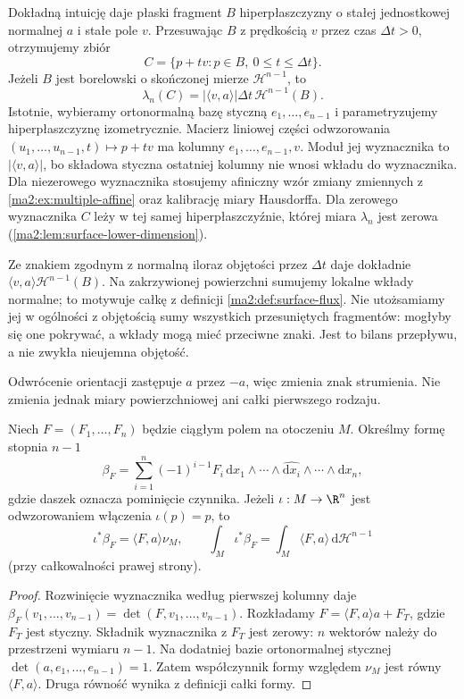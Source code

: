 Dokładną intuicję daje płaski fragment $B$
hiperpłaszczyzny o stałej jednostkowej normalnej $a$
i stałe pole $v$. Przesuwając $B$ z prędkością $v$
przez czas $\Delta t>0$, otrzymujemy zbiór
\[
 C=\{p+tv:p\in B,\ 0\le t\le\Delta t\}.
\]
Jeżeli $B$ jest borelowski o skończonej mierze
$\mathcal H^{n-1}$, to
\[
 \lambda_n(C)=
 |\langle v,a\rangle|\Delta t\,\mathcal H^{n-1}(B).
\]
Istotnie, wybieramy ortonormalną bazę styczną
$e_1,\ldots,e_{n-1}$ i parametryzujemy
hiperpłaszczyznę izometrycznie.
Macierz liniowej części odwzorowania
$(u_1,\ldots,u_{n-1},t)\mapsto p+tv$
ma kolumny $e_1,\ldots,e_{n-1},v$.
Moduł jej wyznacznika to $|\langle v,a\rangle|$,
bo składowa styczna ostatniej kolumny
nie wnosi wkładu do wyznacznika.
Dla niezerowego wyznacznika stosujemy afiniczny
wzór zmiany zmiennych z \ref{ma2:ex:multiple-affine}
oraz kalibrację miary Hausdorffa.
Dla zerowego wyznacznika $C$ leży w tej samej
hiperpłaszczyźnie, której miara $\lambda_n$
jest zerowa (\ref{ma2:lem:surface-lower-dimension}).

Ze znakiem zgodnym z normalną iloraz objętości
przez $\Delta t$ daje dokładnie
$\langle v,a\rangle\mathcal H^{n-1}(B)$.
Na zakrzywionej powierzchni sumujemy lokalne
wkłady normalne; to motywuje całkę z definicji
\ref{ma2:def:surface-flux}.
Nie utożsamiamy jej w ogólności z objętością
sumy wszystkich przesuniętych fragmentów:
mogłyby się one pokrywać, a wkłady mogą mieć
przeciwne znaki. Jest to bilans przepływu,
a nie zwykła nieujemna objętość.

Odwrócenie orientacji zastępuje $a$ przez $-a$,
więc zmienia znak strumienia. Nie zmienia jednak
miary powierzchniowej ani całki pierwszego rodzaju.

\begin{twierdzenie}
\label{ma2:thm:flux-form}
Niech $F=(F_1,\ldots,F_n)$ będzie ciągłym
polem na otoczeniu $M$. Określmy formę
stopnia $n-1$
\[
 \beta_F=\sum_{i=1}^n(-1)^{i-1}F_i\,
 \mathrm dx_1\wedge\cdots\wedge
 \widehat{\mathrm dx_i}\wedge\cdots\wedge\mathrm dx_n,
\]
gdzie daszek oznacza pominięcie czynnika.
Jeżeli $\iota:M\to\R^n$ jest odwzorowaniem włączenia
$\iota(p)=p$, to
\[
 \iota^*\beta_F=\langle F,a\rangle\nu_M,
 \qquad
 \int_M\iota^*\beta_F=\int_M
 \langle F,a\rangle\,\mathrm d\mathcal H^{n-1}
\]
(przy całkowalności prawej strony).
\end{twierdzenie}
\begin{proof}
Rozwinięcie wyznacznika według pierwszej kolumny
daje
$\beta_F(v_1,\ldots,v_{n-1})=\det(F,v_1,\ldots,v_{n-1})$.
Rozkładamy $F=\langle F,a\rangle a+F_T$,
gdzie $F_T$ jest styczny.
Składnik wyznacznika z $F_T$ jest zerowy:
$n$ wektorów należy do przestrzeni wymiaru $n-1$.
Na dodatniej bazie ortonormalnej stycznej
$\det(a,e_1,\ldots,e_{n-1})=1$.
Zatem współczynnik formy względem $\nu_M$
jest równy $\langle F,a\rangle$.
Druga równość wynika z definicji całki formy.
\end{proof}


